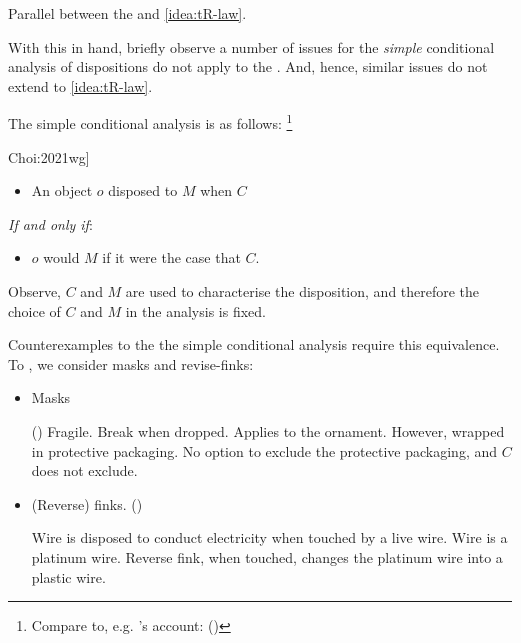 \begin{note}
  Parallel between the \dBCA{} and \autoref{idea:tR-law}.

  With this in hand, briefly observe a number of issues for the \emph{simple} conditional analysis of dispositions do not apply to the \dBCA{}.
  And, hence, similar issues do not extend to \autoref{idea:tR-law}.

  The simple conditional analysis is as follows:%
  \footnote{
    Compare to, e.g. \citeauthor{Lewis:1997wg}'s account:
    (\citeyear[143]{Lewis:1997wg})
  }

  \begin{sketch}[The simple conditional analysis, cf.\ \cite[\S1.2]{Choi:2021wg}]%
    \vspace{-\baselineskip}
    \begin{itemize}
    \item
      An object \(o\) disposed to \(M\) when \(C\)
    \end{itemize}
    \emph{If and only if}:
    \begin{itemize}
    \item
      \(o\) would \(M\) if it were the case that \(C\).
    \end{itemize}
    \vspace{-\baselineskip}
  \end{sketch}

  Observe, \(C\) and \(M\) are used to characterise the disposition, and therefore the choice of \(C\) and \(M\) in the analysis is fixed.

  Counterexamples to the the simple conditional analysis require this equivalence.
  To , we consider masks and revise-finks:

  \begin{itemize}
  \item
    Masks

    (\cite{Johnston:1992aa})
    Fragile.
    Break when dropped.
    Applies to the ornament.
    However, wrapped in protective packaging.
    No option to exclude the protective packaging, and \(C\) does not exclude.
  \item
    (Reverse) finks.
    (\cite{Martin:1994aa})

    Wire is disposed to conduct electricity when touched by a live wire.
    Wire is a platinum wire.
    Reverse fink, when touched, changes the platinum wire into a plastic wire.
  \end{itemize}


\end{note}
